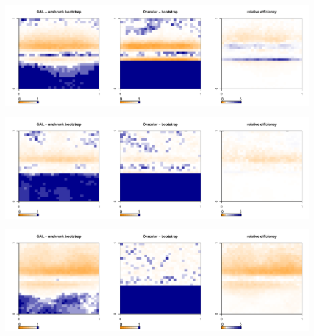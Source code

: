 \documentclass[authoryear, review, 11pt]{elsarticle}
\begin{document}
	\begin{center}
		\includegraphics[width=0.99\textwidth]{../../figures/X1-28-7.pdf}
		\label{fig:coveragemap7}
	\end{center}
		        
	\begin{center}
		\includegraphics[width=0.99\textwidth]{../../figures/X1-28-8.pdf}
		\label{fig:coveragemap8}
	\end{center}
	
	\begin{center}
		\includegraphics[width=0.99\textwidth]{../../figures/X1-28-9.pdf}
		\label{fig:coveragemap9}
	\end{center}
	
\end{document}
